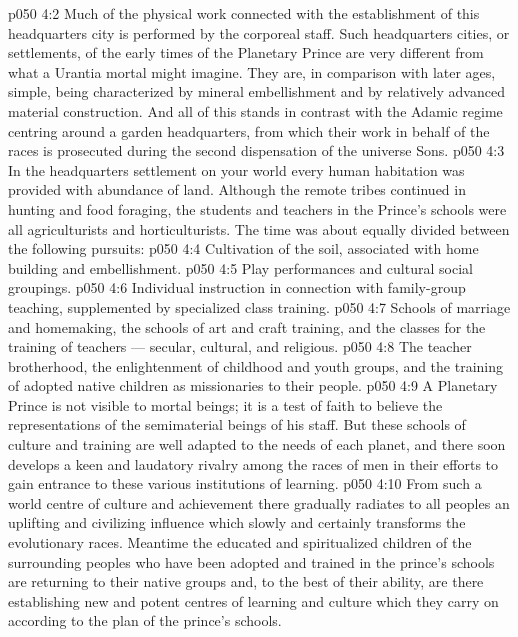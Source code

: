 \vs p050 4:2 Much of the physical work connected with the establishment of this headquarters city is performed by the corporeal staff. Such headquarters cities, or settlements, of the early times of the Planetary Prince are very different from what a Urantia mortal might imagine. They are, in comparison with later ages, simple, being characterized by mineral embellishment and by relatively advanced material construction. And all of this stands in contrast with the Adamic regime centring around a garden headquarters, from which their work in behalf of the races is prosecuted during the second dispensation of the universe Sons.
\vs p050 4:3 \pc In the headquarters settlement on your world every human habitation was provided with abundance of land. Although the remote tribes continued in hunting and food foraging, the students and teachers in the Prince’s schools were all agriculturists and horticulturists. The time was about equally divided between the following pursuits:
\vs p050 4:4 \bibnobreakspace {} Cultivation of the soil, associated with home building and embellishment.
\vs p050 4:5 \bibnobreakspace {} Play performances and cultural social groupings.
\vs p050 4:6 \bibnobreakspace {} Individual instruction in connection with family\hyp{}group teaching, supplemented by specialized class training.
\vs p050 4:7 \bibnobreakspace {} Schools of marriage and homemaking, the schools of art and craft training, and the classes for the training of teachers --- secular, cultural, and religious.
\vs p050 4:8 \bibnobreakspace {} The teacher brotherhood, the enlightenment of childhood and youth groups, and the training of adopted native children as missionaries to their people.
\vs p050 4:9 \pc A Planetary Prince is not visible to mortal beings; it is a test of faith to believe the representations of the semimaterial beings of his staff. But these schools of culture and training are well adapted to the needs of each planet, and there soon develops a keen and laudatory rivalry among the races of men in their efforts to gain entrance to these various institutions of learning.
\vs p050 4:10 From such a world centre of culture and achievement there gradually radiates to all peoples an uplifting and civilizing influence which slowly and certainly transforms the evolutionary races. Meantime the educated and spiritualized children of the surrounding peoples who have been adopted and trained in the prince’s schools are returning to their native groups and, to the best of their ability, are there establishing new and potent centres of learning and culture which they carry on according to the plan of the prince’s schools.
